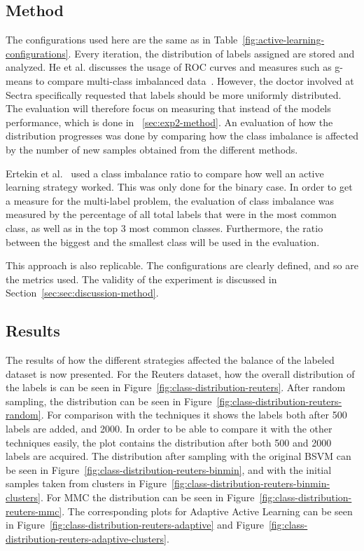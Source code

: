 \subsection{Method}

The configurations used here are the same as in Table~\ref{fig:active-learning-configurations}.
Every iteration, the distribution of labels assigned are stored and analyzed.
He et al\@. discusses the usage of ROC curves and measures such as g-means to compare multi-class imbalanced data~\cite{he2009learning}.
However, the doctor involved at Sectra specifically requested that labels should be more uniformly distributed. 
The evaluation will therefore focus on measuring that instead of the models performance, which is done in ~\ref{sec:exp2-method}.
An evaluation of how the distribution progresses was done by comparing how the class imbalance is affected by the number of new samples obtained from the different methods.

Ertekin et al\@.~\cite{ertekin2007learning} used a class imbalance ratio to compare how well an active learning strategy worked.
This was only done for the binary case.
In order to get a measure for the multi-label problem, the evaluation of class imbalance was measured by the percentage of all total labels that were in the most common class, as well as in the top 3 most common classes.
Furthermore, the ratio between the biggest and the smallest class will be used in the evaluation.

This approach is also replicable.
The configurations are clearly defined, and so are the metrics used.
The validity of the experiment is discussed in Section~\ref{sec:sec:discussion-method}.

\subsection{Results}

The results of how the different strategies affected the balance of the labeled dataset is now presented.
For the Reuters dataset, how the overall distribution of the labels is can be seen in Figure~\ref{fig:class-distribution-reuters}.
After random sampling, the distribution can be seen in Figure~\ref{fig:class-distribution-reuters-random}.
For comparison with the techniques it shows the labels both after 500 labels are added, and 2000.
In order to be able to compare it with the other techniques easily, the plot contains the distribution after both 500 and 2000 labels are acquired.
The distribution after sampling with the original BSVM can be seen in Figure~\ref{fig:class-distribution-reuters-binmin}, and with the initial samples taken from clusters in Figure~\ref{fig:class-distribution-reuters-binmin-clusters}.
For MMC the distribution can be seen in Figure~\ref{fig:class-distribution-reuters-mmc}.
The corresponding plots for Adaptive Active Learning can be seen in Figure~\ref{fig:class-distribution-reuters-adaptive} and Figure~\ref{fig:class-distribution-reuters-adaptive-clusters}.

